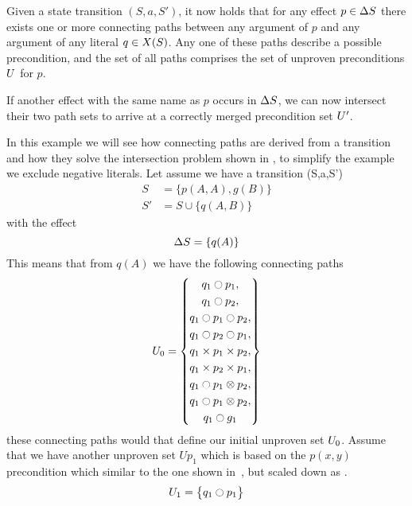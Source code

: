 \documentclass[\master/Master.tex]{subfiles}
\begin{document}
Given a state transition $\left(S, a, S'\right)$, it now holds that for any effect $p \in \Delta S$ there exists one or more connecting paths between any argument of $p$ and any argument of any literal $q \in X(S)$. Any one of these paths describe a possible precondition, and the set of all paths comprises the set of unproven preconditions $U$ for $p$. 

If another effect with the same name as $p$ occurs in $\Delta S$, we can now intersect their two path sets to arrive at a correctly merged precondition set $U'$.

\begin{example}\label{ex:ca:non-binding-interesction-model-fixed}
	In this example we will see how connecting paths are derived from a transition and how they solve the intersection problem shown in , to simplify the example we exclude negative literals.
   Let assume we have a transition (S,a,S')
   \begin{align*}
	   	S &= \{ p(A,A), g(B) \}\\
	   	S'& = S \cup \{ q(A,B) \}
   \end{align*}
   with the effect 
	\begin{equation*}
	 	\Delta S = \{ q(A) \}
	\end{equation*}
	This means that from $q(A)$ we have the following connecting paths
	\begin{align*}
		U_0= 
		\left\{
		\begin{gathered}
			q_1 \ocircle p_1
		,\\	q_1 \ocircle p_2
		,\\	q_1 \ocircle p_1 \ocircle p_2
		,\\	q_1 \ocircle p_2 \ocircle p_1
		,\\	q_1 \times p_1 \times p_2 
		,\\	q_1 \times p_2 \times p_1 
		,\\	q_1 \ocircle p_1 \otimes p_2 
		,\\	q_1 \ocircle p_1 \otimes p_2 
		,\\ q_1 \ocircle g_1	
		\end{gathered}	
		\right\}	
	\end{align*}
   these connecting paths would that define our initial unproven set $U_0$.
   Assume that we have another unproven set $Up_1$ which is based on the $p(x,y)$ precondition which similar to the one shown in~, but scaled down as .
   \begin{align*}
   	U_1=
   	\left\{
   	\begin{gathered}
   		 q_1 \ocircle p_1 
   	\end{gathered}	
   	\right\}	
   \end{align*}
   

\end{example}
\end{document}
